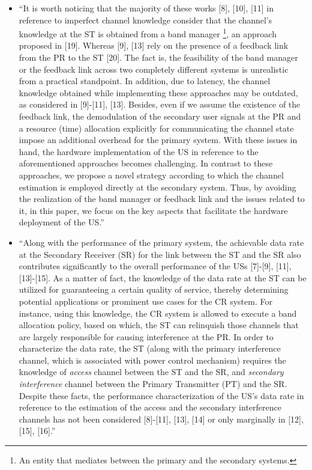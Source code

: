 \documentclass[12pt,a4wide,peerreview]{IEEEtran}
\begin{document}
\begin{itemize}
\item ``It is worth noticing that the majority of these works [8], [10], [11] in reference to imperfect channel knowledge consider that the channel's knowledge at the ST is obtained from a band manager \footnote{An entity that mediates between the primary and the secondary systems.}, an approach proposed in [19]. Whereas [9], [13] rely on the presence of a feedback link from the PR to the ST [20]. The fact is, the feasibility of the band manager or the feedback link across two completely different systems is unrealistic from a practical standpoint. In addition, due to latency, the channel knowledge obtained while implementing these approaches may be outdated, as considered in [9]-[11], [13]. Besides, even if we assume the existence of the feedback link, the demodulation of the secondary user signals at the PR and a resource (time) allocation explicitly for communicating the channel state impose an additional overhead for the primary system. With these issues in hand, the hardware implementation of the US in reference to the aforementioned approaches becomes challenging. In contrast to these approaches, we propose a novel strategy according to which the channel estimation is employed directly at the secondary system. Thus, by avoiding the realization of the band manager or feedback link and the issues related to it, in this paper, we focus on the key aspects that facilitate the hardware deployment of the US.'' 
\item ``Along with the performance of the primary system, the achievable data rate at the Secondary Receiver (SR) for the link between the ST and the SR also contributes significantly to the overall performance of the USs [7]-[9], [11], [13]-[15]. As a matter of fact, the knowledge of the data rate at the ST can be utilized for guaranteeing a certain quality of service, thereby determining potential applications or prominent use cases for the CR system. For instance, using this knowledge, the CR system is allowed to execute a band allocation policy, based on which, the ST can relinquish those channels that are largely responsible for causing interference at the PR. In order to characterize the data rate, the ST (along with the primary interference channel, which is associated with power control mechanism) requires the knowledge of \textit{access} channel between the ST and the SR, and \textit{secondary interference} channel between the Primary Transmitter (PT) and the SR. Despite these facts, the performance characterization of the US's data rate in reference to the estimation of the access and the secondary interference channels has not been considered [8]-[11], [13], [14] or only marginally in [12], [15], [16].''

\end{itemize}
\end{document}
